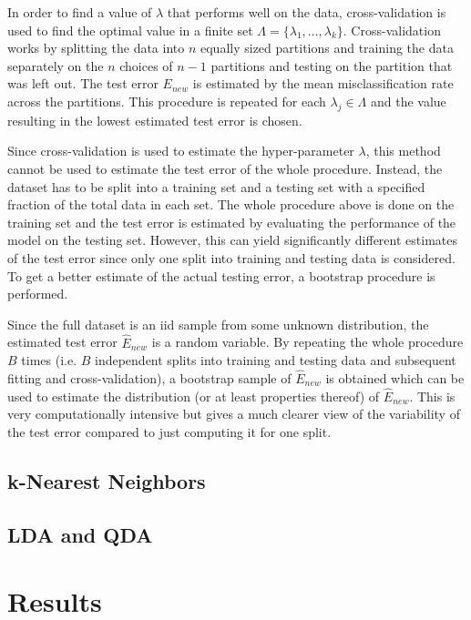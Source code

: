 \documentclass{article}
\begin{document}
In order to find a value of $\lambda$ that performs well on the data, cross-validation is used to find the optimal value in a finite set $\Lambda = \{ \lambda_1,\dots,\lambda_k \}$. Cross-validation works by splitting the data into $n$ equally sized partitions and training the data separately on the $n$ choices of $n-1$ partitions and testing on the partition that was left out. The test error $E_{new}$ is estimated by the mean misclassification rate across the partitions. This procedure is repeated for each $\lambda_j \in \Lambda$ and the value resulting in the lowest estimated test error is chosen.

Since cross-validation is used to estimate the hyper-parameter $\lambda$, this method cannot be used to estimate the test error of the whole procedure. Instead, the dataset has to be split into a training set and a testing set with a specified fraction of the total data in each set. The whole procedure above is done on the training set and the test error is estimated by evaluating the performance of the model on the testing set. However, this can yield significantly different estimates of the test error since only one split into training and testing data is considered. To get a better estimate of the actual testing error, a bootstrap procedure is performed.

Since the full dataset is an iid sample from some unknown distribution, the estimated test error $\hat E_{new}$ is a random variable. By repeating the whole procedure $B$ times (i.e. $B$ independent splits into training and testing data and subsequent fitting and cross-validation), a bootstrap sample of $\hat E_{new}$ is obtained which can be used to estimate the distribution (or at least properties thereof) of $\hat E_{new}$. This is very computationally intensive but gives a much clearer view of the variability of the test error compared to just computing it for one split.

\subsection{k-Nearest Neighbors}

\subsection{LDA and QDA}

\section{Results}
\end{document}

